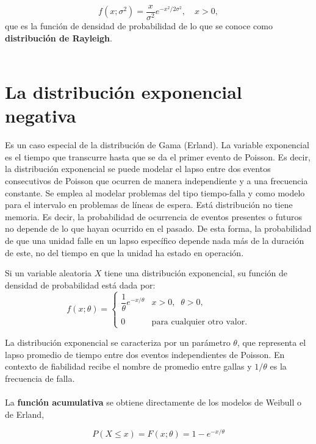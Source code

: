 $$f\left(x;\sigma^2\right)=\dfrac{x}{\sigma^2}e^{-x^2/2\sigma^2},\quad x>0,$$
que es la función de densidad de probabilidad de lo que se conoce como \textbf{distribución de Rayleigh}.\\\\

\section{La distribución exponencial negativa}
Es un caso especial de la distribución de Gama (Erland). La variable exponencial es el tiempo que transcurre hasta que se da el primer evento de Poisson. Es decir, la distribución exponencial se puede modelar el lapso entre dos eventos consecutivos de Poisson que ocurren de manera independiente y a una frecuencia constante. Se emplea al modelar problemas del tipo tiempo-falla y como modelo para el intervalo en problemas de líneas de espera. Está distribución no tiene memoria. Es decir, la probabilidad de ocurrencia de eventos presentes o futuros no depende de lo que hayan ocurrido en el pasado. De esta forma, la probabilidad de que una unidad falle en un lapso específico depende nada más de la duración de este, no del tiempo en que la unidad ha estado en operación.

\begin{tcolorbox}
    \begin{def.}
	Si un variable aleatoria $X$ tiene una distribución exponencial, su función de densidad de probabilidad está dada por:
	$$f(x;\theta)=\left\{
	    \begin{array}{ll}
		\dfrac{1}{\theta}e^{-x/\theta} & x>0,\;\; \theta > 0,\\\\
		0 & \mbox{para cualquier otro valor}.
	    \end{array}
	\right.$$
    \end{def.}
\end{tcolorbox}

La distribución exponencial se caracteriza por un parámetro $\theta$, que representa el lapso promedio de tiempo entre dos eventos independientes de Poisson. En contexto de fiabilidad recibe el nombre de promedio entre gallas y $1/\theta$ es la frecuencia de falla.\\\\
La \textbf{función acumulativa} se obtiene directamente de los modelos de Weibull o de Erland,

\begin{tcolorbox}
    $$P(X\leq x)=F(x;\theta)=1-e^{-x/\theta}$$
\end{tcolorbox}

